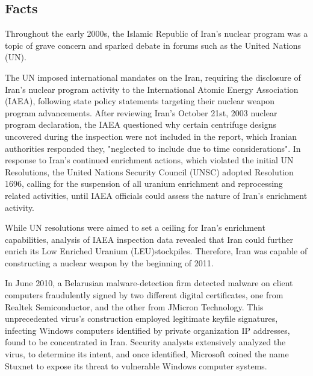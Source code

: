 \documentclass[12pt]{article}
\begin{document}
\begin{multicols}{2}

\section{Facts}

Throughout the early 2000s, the Islamic Republic of Iran's nuclear program was a topic of grave concern and sparked debate in forums such as the United Nations (UN).\cite{unitedNationsResolutions}

The UN imposed international mandates on the Iran, requiring the disclosure of Iran's nuclear program activity to the International Atomic Energy Association (IAEA), following state policy statements targeting their nuclear weapon program advancements. After reviewing Iran's October 21st, 2003 nuclear program declaration, the IAEA questioned why certain centrifuge designs uncovered during the inspection were not included in the report, which Iranian authorities responded they, "neglected to include due to time considerations".\cite{implementationOfNPTSafeguards} In response to Iran's continued enrichment actions, which violated the initial UN Resolutions, the United Nations Security Council (UNSC) adopted Resolution 1696, calling for the suspension of all uranium enrichment and reprocessing related activities, until IAEA officials could assess the nature of Iran's enrichment activity.\cite{resolution1696}

While UN resolutions were aimed to set a ceiling for Iran's enrichment capabilities, analysis of IAEA inspection data revealed that Iran could further enrich its Low Enriched Uranium (LEU)\footnotemark[1] stockpiles.  Therefore, Iran was capable of constructing a nuclear weapon by the beginning of 2011.\cite{hasIranAchievedaNuclearWeapon}

In June 2010, a Belarusian malware-detection firm detected malware on client computers fraudulently signed by two different digital certificates, one from Realtek Semiconductor, and the other from JMicron Technology.\cite{theRealStoryOfStuxnet} This unprecedented virus's construction employed legitimate keyfile signatures, infecting Windows computers identified by private organization IP addresses, found to be concentrated in Iran.\cite{w32.stuxnetDossier} Security analysts extensively analyzed the virus, to determine its intent, and once identified, Microsoft coined the name Stuxnet to expose its threat to vulnerable Windows computer systems.\cite{microsoftCoinsStuxnet}


\end{multicols}
\end{document}
